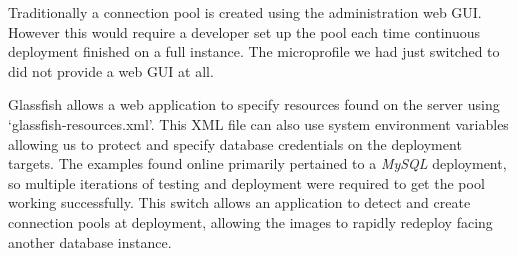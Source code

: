 \par
Traditionally a connection pool is created using the administration web GUI. However this would require a developer set up the pool each time continuous deployment finished on a full instance. The microprofile we had just switched to did not provide a web GUI at all.

\par
Glassfish allows a web application to specify resources found on the server using `glassfish-resources.xml'. This XML file can also use system environment variables allowing us to protect and specify database credentials on the deployment targets. The examples found online primarily pertained to a \textit{MySQL} deployment, so multiple iterations of testing and deployment were required to get the pool working successfully. This switch allows an application to detect and create connection pools at deployment, allowing the images to rapidly redeploy facing another database instance.